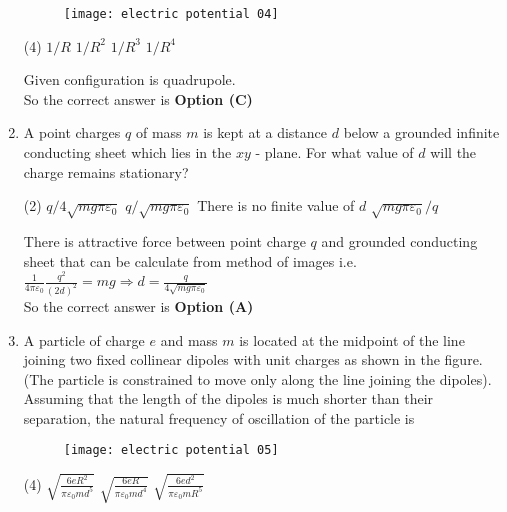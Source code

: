\begin{enumerate}
	\begin{figure}[H]
		\centering
		\texttt{[image: electric potential 04]}
	\end{figure}
	\begin{tasks}(4)
		\task[\textbf{A.}] $1 / R$
		\task[\textbf{B.}] $1 / R^{2}$
		\task[\textbf{C.}] $1 / R^{3}$
		\task[\textbf{D.}] $1 / R^{4}$
	\end{tasks}
	\begin{answer}
		Given configuration is quadrupole.\\
		So the correct answer is \textbf{Option (C)}
	\end{answer}
	\item  A point charges $q$ of mass $m$ is kept at a distance $d$ below a grounded infinite conducting sheet which lies in the $x y$ - plane. For what value of $d$ will the charge remains stationary?
	{}
	\begin{tasks}(2)
		\task[\textbf{A.}] $q / 4 \sqrt{m g \pi \varepsilon_{0}}$
		\task[\textbf{B.}] $q / \sqrt{m g \pi \varepsilon_{0}}$
		\task[\textbf{C.}] There is no finite value of $d$
		\task[\textbf{D.}]  $\sqrt{m g \pi \varepsilon_{0}} / q$
	\end{tasks}
	\begin{answer}
		There is attractive force between point charge $q$ and grounded conducting sheet that can be calculate from method of images i.e. $\frac{1}{4 \pi \varepsilon_{0}} \frac{q^{2}}{(2 d)^{2}}=m g \Rightarrow d=\frac{q}{4 \sqrt{m g \pi \varepsilon_{0}}}$\\
		So the correct answer is \textbf{Option (A)}
	\end{answer}
	\item A particle of charge $e$ and mass $m$ is located at the midpoint of the line joining two fixed collinear dipoles with unit charges as shown in the figure. (The particle is constrained to move only along the line joining the dipoles). Assuming that the length of the dipoles is much shorter than their separation, the natural frequency of oscillation of the particle is
	{}
	\begin{figure}[H]
		\centering
		\texttt{[image: electric potential 05]}
	\end{figure}
	\begin{tasks}(4)
		\task[\textbf{A.}] $\sqrt{\frac{6 e R^{2}}{\pi \varepsilon_{0} m d^{5}}}$
		\task[\textbf{B.}] $\sqrt{\frac{6 e R}{\pi \varepsilon_{0} m d^{4}}}$
		\task[\textbf{C.}]  $\sqrt{\frac{6 e d^{2}}{\pi \varepsilon_{0} m R^{5}}}$

\end{tasks}
\end{enumerate}
